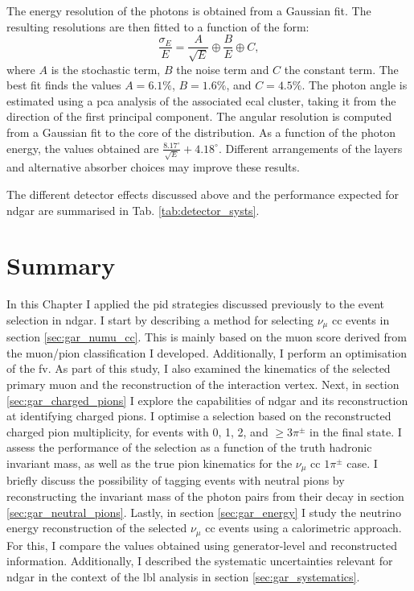The energy resolution of the photons is obtained from a Gaussian fit. The resulting resolutions are then fitted to a function of the form:
\begin{equation}
    \frac{\sigma_{E}}{E} = \frac{A}{\sqrt{E}} \oplus \frac{B}{E} \oplus C,
\end{equation}
where $A$ is the stochastic term, $B$ the noise term and $C$ the constant term. The best fit finds the values $A=6.1\%$, $B=1.6\%$, and $C=4.5\%$. The photon angle is estimated using a \gls{pca} analysis of the associated \gls{ecal} cluster, taking it from the direction of the first principal component. The angular resolution is computed from a Gaussian fit to the core of the distribution. As a function of the photon energy, the values obtained are $\frac{8.17^{\circ}}{\sqrt{E}} + 4.18^{\circ}$. Different arrangements of the layers and alternative absorber choices may improve these results.

The different detector effects discussed above and the performance expected for \gls{ndgar} are summarised in Tab. \ref{tab:detector_systs}.

\section{Summary}

In this Chapter I applied the \gls{pid} strategies discussed previously to the event selection in \gls{ndgar}. I start by describing a method for selecting $\nu_{\mu}$ \gls{cc} events in section \ref{sec:gar_numu_cc}. This is mainly based on the muon score derived from the muon/pion classification I developed. Additionally, I perform an optimisation of the \gls{fv}. As part of this study, I also examined the kinematics of the selected primary muon and the reconstruction of the interaction vertex. Next, in section \ref{sec:gar_charged_pions} I explore the capabilities of \gls{ndgar} and its reconstruction at identifying charged pions. I optimise a selection based on the reconstructed charged pion multiplicity, for events with 0, 1, 2, and $\geq 3 \pi^{\pm}$ in the final state. I assess the performance of the selection as a function of the truth hadronic invariant mass, as well as the true pion kinematics for the $\nu_{\mu}$ \gls{cc} $1\pi^{\pm}$ case. I briefly discuss the possibility of tagging events with neutral pions by reconstructing the invariant mass of the photon pairs from their decay in section \ref{sec:gar_neutral_pions}. Lastly, in section \ref{sec:gar_energy} I study the neutrino energy reconstruction of the selected $\nu_{\mu}$ \gls{cc} events using a calorimetric approach. For this, I compare the values obtained using generator-level and reconstructed information. Additionally, I described the systematic uncertainties relevant for \gls{ndgar} in the context of the \gls{lbl} analysis in section \ref{sec:gar_systematics}.

